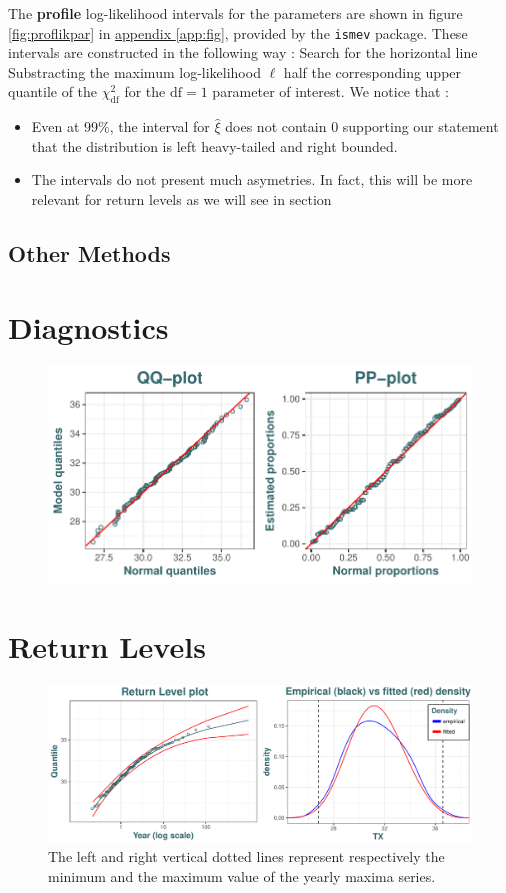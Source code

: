 \documentclass[11pt,a4paper,openany ]{book}
\begin{document}
The \textbf{profile} log-likelihood intervals for the parameters are shown in figure \ref{fig:proflikpar} in \hyperref[app:fig]{appendix \ref{app:fig}}, provided by the \texttt{ismev} package. These intervals are constructed in the following way : Search for the horizontal line Substracting the maximum log-likelihood $\ell$ half the corresponding upper quantile of the $\chi^2_{\text{df}}$ for the $\text{df}=1$ parameter of interest. We notice that :
\begin{itemize}
\item Even at $99\%$, the interval for $\hat{\xi}$ does not contain 0 supporting our statement that the distribution is left heavy-tailed and right bounded.
\item The intervals do not present much asymetries. In fact, this will be more relevant for return levels as we will see in section
\end{itemize}


\subsection{Other Methods}


\section{Diagnostics}

\begin{figure}[!htb]
\centering	\includegraphics[width=.7\linewidth]{pp_qqplot.pdf}\caption{}\label{fig:ppqqplot}
\end{figure}


\section{Return Levels}

\begin{figure}[!htb]
\centering	\includegraphics[width=.75\linewidth]{rl_empdes.pdf}\caption{ The left and right vertical dotted lines represent respectively the minimum and the maximum value of the yearly maxima series.}\label{fig:rl_empdes}
\end{figure}
\end{document}
